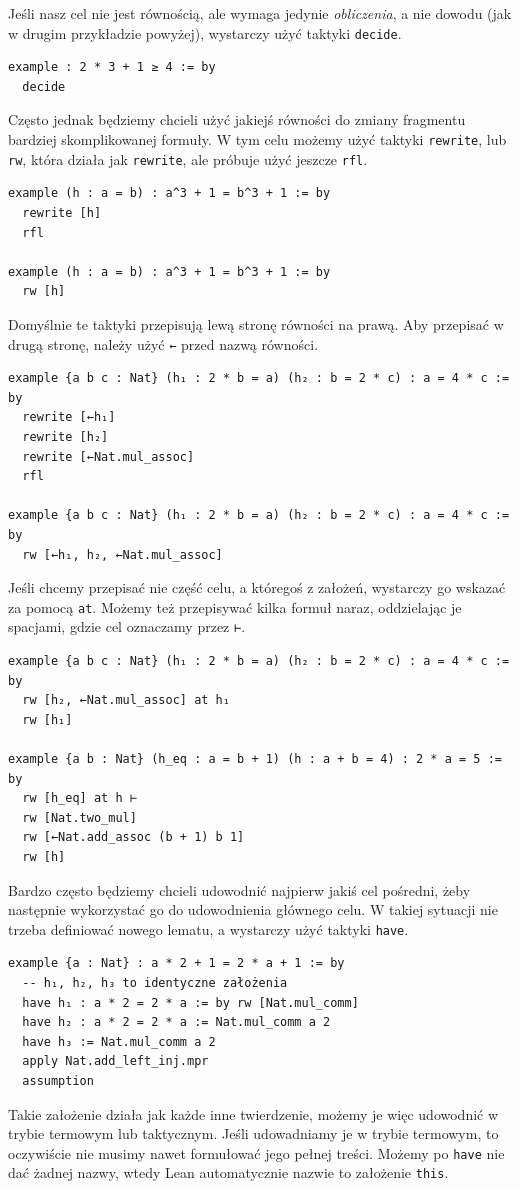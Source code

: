 \documentclass[polish,pretty,bibliography=totocnumbered]{angav}
\newcommand{\Lean}[1]{\texttt{#1}}
\begin{document}
Jeśli nasz cel nie jest równością, ale wymaga jedynie \emph{obliczenia}, a nie dowodu (jak w drugim przykładzie powyżej), wystarczy użyć taktyki \Lean{decide}.
\begin{verbatim}
example : 2 * 3 + 1 ≥ 4 := by
  decide
\end{verbatim}

Często jednak będziemy chcieli użyć jakiejś równości do zmiany fragmentu bardziej skomplikowanej formuły. W tym celu możemy użyć taktyki \Lean{rewrite}, lub \Lean{rw}, która działa jak \Lean{rewrite}, ale próbuje użyć jeszcze \Lean{rfl}.
\begin{verbatim}
example (h : a = b) : a^3 + 1 = b^3 + 1 := by
  rewrite [h]
  rfl

example (h : a = b) : a^3 + 1 = b^3 + 1 := by
  rw [h]
\end{verbatim}
Domyślnie te taktyki przepisują lewą stronę równości na prawą. Aby przepisać w drugą stronę, należy użyć \Lean{←} przed nazwą równości.
\begin{verbatim}
example {a b c : Nat} (h₁ : 2 * b = a) (h₂ : b = 2 * c) : a = 4 * c := by
  rewrite [←h₁]
  rewrite [h₂]
  rewrite [←Nat.mul_assoc]
  rfl

example {a b c : Nat} (h₁ : 2 * b = a) (h₂ : b = 2 * c) : a = 4 * c := by
  rw [←h₁, h₂, ←Nat.mul_assoc]
\end{verbatim}
Jeśli chcemy przepisać nie część celu, a któregoś z założeń, wystarczy go wskazać za pomocą \Lean{at}. Możemy też przepisywać kilka formuł naraz, oddzielając je spacjami, gdzie cel oznaczamy przez \Lean{⊢}.
\begin{verbatim}
example {a b c : Nat} (h₁ : 2 * b = a) (h₂ : b = 2 * c) : a = 4 * c := by
  rw [h₂, ←Nat.mul_assoc] at h₁
  rw [h₁]

example {a b : Nat} (h_eq : a = b + 1) (h : a + b = 4) : 2 * a = 5 := by
  rw [h_eq] at h ⊢
  rw [Nat.two_mul]
  rw [←Nat.add_assoc (b + 1) b 1]
  rw [h]
\end{verbatim}

Bardzo często będziemy chcieli udowodnić najpierw jakiś cel pośredni, żeby następnie wykorzystać go do udowodnienia głównego celu. W takiej sytuacji nie trzeba definiować nowego lematu, a wystarczy użyć taktyki \Lean{have}.
\begin{verbatim}
example {a : Nat} : a * 2 + 1 = 2 * a + 1 := by
  -- h₁, h₂, h₃ to identyczne założenia
  have h₁ : a * 2 = 2 * a := by rw [Nat.mul_comm]
  have h₂ : a * 2 = 2 * a := Nat.mul_comm a 2
  have h₃ := Nat.mul_comm a 2
  apply Nat.add_left_inj.mpr
  assumption

\end{verbatim}
Takie założenie działa jak każde inne twierdzenie, możemy je więc udowodnić w trybie termowym lub taktycznym.
Jeśli udowadniamy je w trybie termowym, to oczywiście nie musimy nawet formułować jego pełnej treści.
Możemy po \Lean{have} nie dać żadnej nazwy, wtedy Lean automatycznie nazwie to założenie \Lean{this}.
\end{document}
